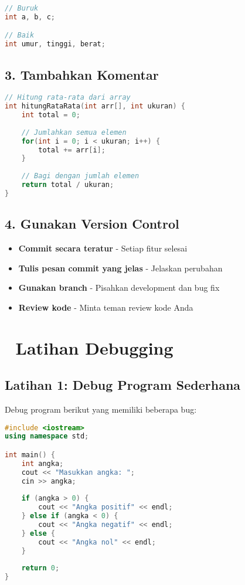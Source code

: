 \begin{lstlisting}[language=c++, caption=Nama Variabel yang Bermakna]
// Buruk
int a, b, c;

// Baik
int umur, tinggi, berat;
\end{lstlisting}

\subsection{3. Tambahkan Komentar}

\begin{lstlisting}[language=c++, caption=Komentar yang Berguna]
// Hitung rata-rata dari array
int hitungRataRata(int arr[], int ukuran) {
    int total = 0;
    
    // Jumlahkan semua elemen
    for(int i = 0; i < ukuran; i++) {
        total += arr[i];
    }
    
    // Bagi dengan jumlah elemen
    return total / ukuran;
}
\end{lstlisting}

\subsection{4. Gunakan Version Control}

\begin{itemize}
\item \textbf{Commit secara teratur} - Setiap fitur selesai
\item \textbf{Tulis pesan commit yang jelas} - Jelaskan perubahan
\item \textbf{Gunakan branch} - Pisahkan development dan bug fix
\item \textbf{Review kode} - Minta teman review kode Anda
\end{itemize}

\section{🎯 Latihan Debugging}

\subsection{Latihan 1: Debug Program Sederhana}

Debug program berikut yang memiliki beberapa bug:

\begin{lstlisting}[language=c++, caption=Program dengan Bug]
#include <iostream>
using namespace std;

int main() {
    int angka;
    cout << "Masukkan angka: ";
    cin >> angka;
    
    if (angka > 0) {
        cout << "Angka positif" << endl;
    } else if (angka < 0) {
        cout << "Angka negatif" << endl;
    } else {
        cout << "Angka nol" << endl;
    }
    
    return 0;
}
\end{lstlisting}

